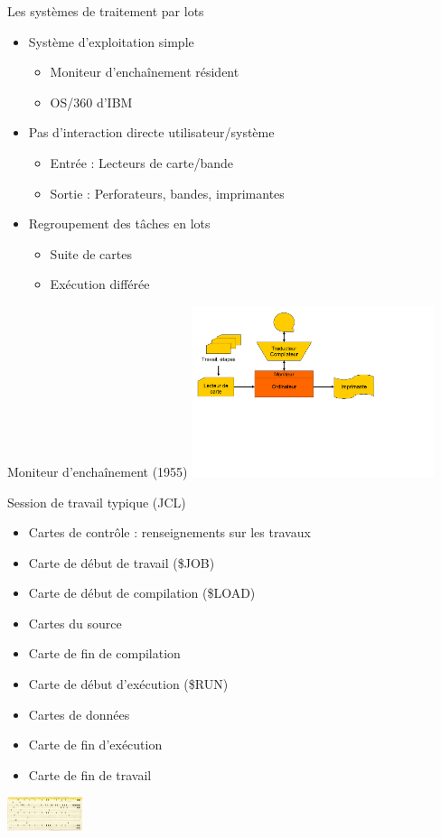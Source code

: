 \begin{frame}{Les systèmes de traitement par lots}
\begin{itemize}
\item Système d'exploitation simple 
\begin{itemize}
\item Moniteur d’enchaînement résident
\item OS/360 d’IBM
\end{itemize}
\item Pas d'interaction directe utilisateur/système
\begin{itemize}
\item Entrée : Lecteurs de carte/bande
\item Sortie : Perforateurs, bandes, imprimantes
\end{itemize}
\item Regroupement des tâches en lots
\begin{itemize}
\item Suite de cartes
\item Exécution différée
\end{itemize}
\end{itemize}
\end{frame}

\begin{frame}{Moniteur d’enchaînement (1955)}
\includegraphics[height=5cm]{../illustration/moniteur_enchainement.pdf}
\end{frame}

\begin{frame}{Session de travail typique (JCL)}
\begin{itemize}
\item Cartes de contrôle : renseignements sur les travaux
\item Carte de début de travail (\$JOB)
\item Carte de début de compilation (\$LOAD)
\item Cartes du source
\item Carte de fin de compilation
\item Carte de début d’exécution (\$RUN)
\item Cartes de données
\item Carte de fin d’exécution
\item Carte de fin de travail
\end{itemize}
\includegraphics[height=1cm]{../illustration/carte_jcl.png}
\end{frame}

